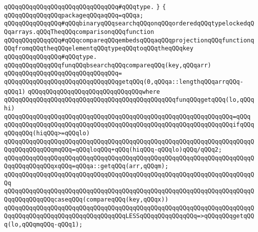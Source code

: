 \verb|qQQqqQQqqQQqqQQqqQQqqQQqqQQqqQQq#qQQqtype.|\newline
\newline
\newline
\verb|}|\newline
\verb|{|\newline
\verb|qQQqqQQqqQQqqQQqpackageqQQqaqQQq=qQQqa;|\newline
\newline
\verb|qQQqqQQqqQQqqQQq#qQQqbinaryqQQqsearchqQQqonqQQqorderedqQQqtypelockedqQQqarrays.qQQqTheqQQqcomparisonqQQqfunction|\newline
\verb|qQQqqQQqqQQqqQQq#qQQqcompareqQQqembedsqQQqaqQQqprojectionqQQqfunctionqQQqfromqQQqtheqQQqelementqQQqtypeqQQqtoqQQqtheqQQqkey|\newline
\verb|qQQqqQQqqQQqqQQq#qQQqtype.|\newline
\newline
\verb|qQQqqQQqqQQqqQQqfunqQQqbsearchqQQqcompareqQQq(key,qQQqarr)|\newline
\verb|qQQqqQQqqQQqqQQqqQQqqQQqqQQqqQQq=|\newline
\verb|qQQqqQQqqQQqqQQqqQQqqQQqqQQqqQQqgetqQQq(0,qQQqa::lengthqQQqarrqQQq-qQQq1)|\newline
\verb|qQQqqQQqqQQqqQQqqQQqqQQqqQQqqQQqwhere|\newline
\verb|qQQqqQQqqQQqqQQqqQQqqQQqqQQqqQQqqQQqqQQqqQQqqQQqfunqQQqgetqQQq(lo,qQQqhi)|\newline
\verb|qQQqqQQqqQQqqQQqqQQqqQQqqQQqqQQqqQQqqQQqqQQqqQQqqQQqqQQqqQQqqQQq=qQQq|\newline
\verb|qQQqqQQqqQQqqQQqqQQqqQQqqQQqqQQqqQQqqQQqqQQqqQQqqQQqqQQqqQQqqQQqifqQQqqQQqqQQq(hiqQQq>=qQQqlo)|\newline
\newline
\verb|qQQqqQQqqQQqqQQqqQQqqQQqqQQqqQQqqQQqqQQqqQQqqQQqqQQqqQQqqQQqqQQqqQQqqQQqqQQqqQQqqQQqmqQQq=qQQqloqQQq+qQQq(hiqQQq-qQQqlo)qQQq/qQQq2;|\newline
\verb|qQQqqQQqqQQqqQQqqQQqqQQqqQQqqQQqqQQqqQQqqQQqqQQqqQQqqQQqqQQqqQQqqQQqqQQqqQQqqQQqqQQqxqQQq=qQQqa::getqQQq(arr,qQQqm);|\newline
\verb|qQQqqQQqqQQqqQQqqQQqqQQqqQQqqQQqqQQqqQQqqQQqqQQqqQQqqQQqqQQqqQQqqQQqqQQq|\newline
\verb|qQQqqQQqqQQqqQQqqQQqqQQqqQQqqQQqqQQqqQQqqQQqqQQqqQQqqQQqqQQqqQQqqQQqqQQqqQQqqQQqqQQqcaseqQQq(compareqQQq(key,qQQqx))|\newline
\verb|qQQqqQQqqQQqqQQqqQQqqQQqqQQqqQQqqQQqqQQqqQQqqQQqqQQqqQQqqQQqqQQqqQQqqQQqqQQqqQQqqQQqqQQqqQQqqQQqqQQqqQQqLESSqQQqqQQqqQQqqQQq=>qQQqqQQqgetqQQq(lo,qQQqmqQQq-qQQq1);|\newline
